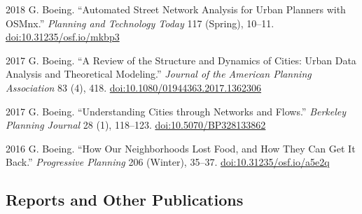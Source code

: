 \documentclass[12pt,letterpaper]{report}
\begin{document}
    \begin{tablist}

        \item[2018] \tab{}G. Boeing. \enquote{Automated Street Network Analysis for Urban Planners with OSMnx.} \textit{Planning and Technology Today} 117 (Spring), 10--11. \href{https://doi.org/10.31235/osf.io/mkbp3}{doi:10.31235/osf.io/mkbp3}

        \item[2017] \tab{}G. Boeing. \enquote{A Review of the Structure and Dynamics of Cities: Urban Data Analysis and Theoretical Modeling.} \textit{Journal of the American Planning Association} 83 (4), 418. \href{https://doi.org/10.1080/01944363.2017.1362306}{doi:10.1080/01944363.2017.1362306}

        \item[2017] \tab{}G. Boeing. \enquote{Understanding Cities through Networks and Flows.} \textit{Berkeley Planning Journal} 28 (1), 118--123. \href{https://doi.org/10.5070/BP328133862}{doi:10.5070/BP328133862}

        \item[2016] \tab{}G. Boeing. \enquote{How Our Neighborhoods Lost Food, and How They Can Get It Back.} \textit{Progressive Planning} 206 (Winter), 35--37. \href{https://doi.org/10.31235/osf.io/a5e2q}{doi:10.31235/osf.io/a5e2q}

    \end{tablist}



    \subsection*{Reports and Other Publications}
\end{document}
